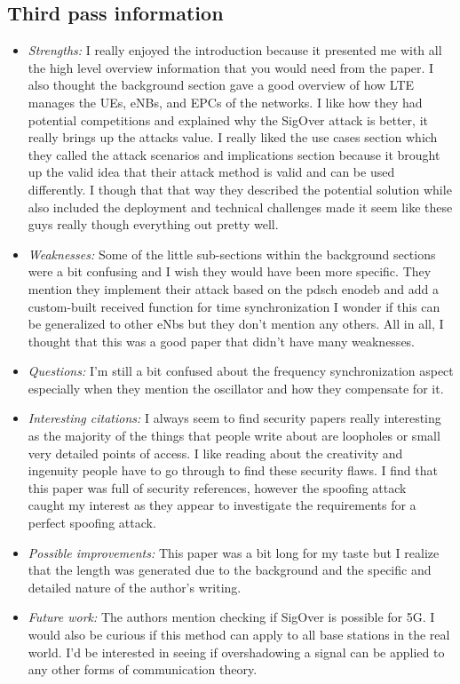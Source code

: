 \documentclass[letterpaper,twocolumn,10pt]{article}
\begin{document}
\subsection{Third pass information}
\label{sec:third}
\begin{itemize}

\item {\it Strengths:} 
I really enjoyed the introduction because it presented me with all the high level overview information that you would
need from the paper. I also thought the background section gave a good overview of how LTE manages the UEs, eNBs,
and EPCs of the networks. I like how they had potential competitions and explained why the SigOver attack is better, it 
really brings up the attacks value. I really liked the use cases section which they called the attack scenarios and implications
section because it brought up the valid idea that their attack method is valid and can be used differently. I though that 
that way they described the potential solution while also included the deployment and technical challenges made it
seem like these guys really though everything out pretty well.

\item {\it Weaknesses:} 
Some of the little sub-sections within the background sections were a bit confusing and I wish they would have been more 
specific. 
They mention they implement their attack based on the pdsch enodeb and add a custom-built received function for time
synchronization I wonder if this can be generalized to other eNbs but they don't mention any others. All in all, I thought
that this was a good paper that didn't have many weaknesses. 

\item {\it Questions:}
I'm still a bit confused about the frequency synchronization aspect especially when they mention the oscillator and how 
they compensate for it.

\item {\it Interesting citations:} 
I always seem to find security papers really interesting as the majority of the things that people write about are loopholes
or small very detailed points of access. I like reading about the creativity and ingenuity people have to go through to 
find these security flaws. I find that this paper was full of security references, however the spoofing attack ~\cite{spoofing}
caught my interest as they appear to investigate the requirements for a perfect spoofing attack.

\item {\it Possible improvements:} 
This paper was a bit long for my taste but I realize that the length was generated due to the background and the 
specific and detailed nature of the author's writing. 

\item {\it Future work:} 
The authors mention checking if SigOver is possible for 5G. I would also be curious if this method can apply to 
all base stations in the real world. I'd be interested in seeing if overshadowing a signal can be applied to any 
other forms of communication theory. 

\end{itemize}

{
  \small 
  
  
}
\end{document}
